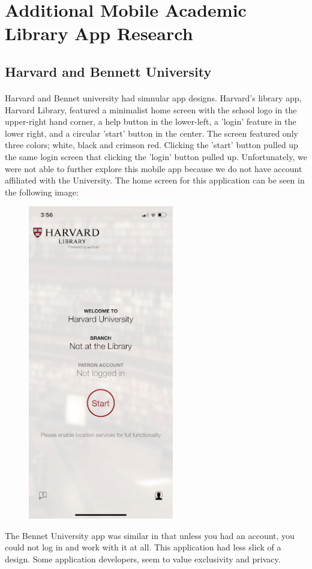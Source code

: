 \section{Additional Mobile Academic Library App Research}
        \subsection{Harvard and Bennett University}
            \paragraph{}
            Harvard and Bennet university had simnular app designs. Harvard's library app, Harvard Library, featured a minimalist home screen with the school logo in the upper-right hand corner, a help button in the lower-left, a 'login' feature in the lower right, and a circular 'start' button in the center. The screen featured only three colors; white, black and crimson red. Clicking the 'start' button pulled up the same login screen that clicking the 'login' button pulled up.  Unfortunately, we were not able to further explore this mobile app because we do not have account affiliated with the University. The home screen for this application can be seen in the following image: 
            \begin{figure}[htbp]
            \centerline{\includegraphics[width=2.5in]{unnamed-4.png}}
            \end{figure}
            The Bennet University app was similar in that unless you had an account, you could not log in and work with it at all. This application had less slick of a design. Some application developers, seem to value exclusivity and privacy. 
